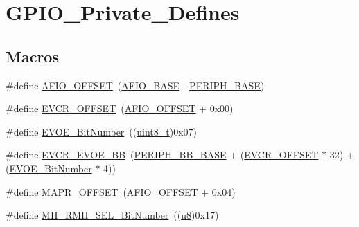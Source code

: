 \hypertarget{group___g_p_i_o___private___defines}{}\section{G\+P\+I\+O\+\_\+\+Private\+\_\+\+Defines}
\label{group___g_p_i_o___private___defines}
\subsection*{Macros}
\begin{DoxyCompactItemize}
\item 
\#define \hyperlink{group___g_p_i_o___private___defines_ga0ecdd0dd5180e1ee385c22f66a2cd660}{A\+F\+I\+O\+\_\+\+O\+F\+F\+S\+ET}~(\hyperlink{openmotestm_2library_2inc_2stm32f10x__map_8h_a5f7e3eacfcf4c313c25012795148a680}{A\+F\+I\+O\+\_\+\+B\+A\+SE} -\/ \hyperlink{openmotestm_2library_2inc_2stm32f10x__map_8h_a9171f49478fa86d932f89e78e73b88b0}{P\+E\+R\+I\+P\+H\+\_\+\+B\+A\+SE})
\item 
\#define \hyperlink{group___g_p_i_o___private___defines_gaf8c24f39392c89142f1b97a418669d5d}{E\+V\+C\+R\+\_\+\+O\+F\+F\+S\+ET}~(\hyperlink{openmotestm_2library_2src_2stm32f10x__gpio_8c_a0ecdd0dd5180e1ee385c22f66a2cd660}{A\+F\+I\+O\+\_\+\+O\+F\+F\+S\+ET} + 0x00)
\item 
\#define \hyperlink{group___g_p_i_o___private___defines_ga8e4fdee57fe3447cdbc5d00ccab60c18}{E\+V\+O\+E\+\_\+\+Bit\+Number}~((\hyperlink{_p_e___types_8h_aba7bc1797add20fe3efdf37ced1182c5}{uint8\+\_\+t})0x07)
\item 
\#define \hyperlink{group___g_p_i_o___private___defines_ga6e4f8c4e3def38811ac6c03b4f64240b}{E\+V\+C\+R\+\_\+\+E\+V\+O\+E\+\_\+\+BB}~(\hyperlink{openmotestm_2library_2inc_2stm32f10x__map_8h_aed7efc100877000845c236ccdc9e144a}{P\+E\+R\+I\+P\+H\+\_\+\+B\+B\+\_\+\+B\+A\+SE} + (\hyperlink{openmotestm_2library_2src_2stm32f10x__gpio_8c_af8c24f39392c89142f1b97a418669d5d}{E\+V\+C\+R\+\_\+\+O\+F\+F\+S\+ET} $\ast$ 32) + (\hyperlink{openmotestm_2library_2src_2stm32f10x__gpio_8c_a8e4fdee57fe3447cdbc5d00ccab60c18}{E\+V\+O\+E\+\_\+\+Bit\+Number} $\ast$ 4))
\item 
\#define \hyperlink{group___g_p_i_o___private___defines_ga472f80f63d09e365d283675f3466c8a1}{M\+A\+P\+R\+\_\+\+O\+F\+F\+S\+ET}~(\hyperlink{openmotestm_2library_2src_2stm32f10x__gpio_8c_a0ecdd0dd5180e1ee385c22f66a2cd660}{A\+F\+I\+O\+\_\+\+O\+F\+F\+S\+ET} + 0x04)
\item 
\#define \hyperlink{group___g_p_i_o___private___defines_gad4a9bbd669109039291f942d923ff8ae}{M\+I\+I\+\_\+\+R\+M\+I\+I\+\_\+\+S\+E\+L\+\_\+\+Bit\+Number}~((\hyperlink{agilefox_2library_2inc_2stm32f10x__type_8h_aed742c436da53c1080638ce6ef7d13de}{u8})0x17)

\end{DoxyCompactItemize}
